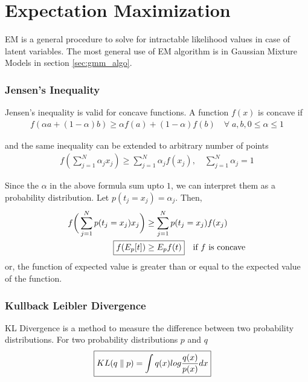 \documentclass[../../statistical_learning_notes.tex]{subfiles}
\begin{document}
\section{Expectation Maximization}
EM is a general procedure to solve for intractable likelihood values in case of latent variables. The most general use of EM algorithm is in Gaussian Mixture Models in section \ref{sec:gmm_algo}.


\subsubsection*{Jensen's Inequality}
Jensen's inequality is valid for concave functions. A function $f(x)$ is concave if
\begin{align*}
    f(\alpha a + (1-\alpha)b) \geq \alpha f(a) + (1-\alpha)f(b) \quad \forall \; a, b, 0 \leq \alpha \leq 1
\end{align*}

and the same inequality can be extended to arbitrary number of points
\begin{align*}
    f(\sum_{j=1}^{N} \alpha_{j}x_{j}) \geq \sum_{j=1}^{N} \alpha_{j} f(x_{j}), \quad \sum_{j=1}^{N} \alpha_{j} = 1
\end{align*}

Since the $\alpha$ in the above formula sum upto $1$, we can interpret them as a probability distribution. Let $p(t_{j} = x_{j}) = \alpha_{j}$. Then,
\begin{align*}
    f \bigg(\sum_{j=1}^{N} p(t_{j} = x_{j})x_{j} \bigg) &\geq \sum_{j=1}^{N} p(t_{j} = x_{j}) f(x_{j})\\
    \Aboxed{f(E_{p}[t]) &\geq E_{p}f(t)} \quad \text{if $f$ is concave}
\end{align*}
or, the function of expected value is greater than or equal to the expected value of the function.


\subsubsection*{Kullback Leibler Divergence}
KL Divergence is a method to measure the difference between two probability distributions. For two probability distributions $p$ and $q$
\begin{align*}
    \Aboxed{\KL{q}{p} = \int q(x) log\frac{q(x)}{p(x)} dx}
\end{align*}
\end{document}
